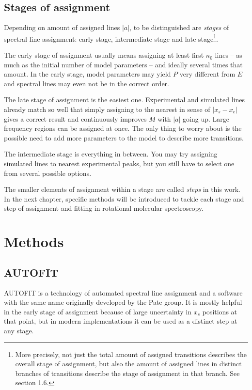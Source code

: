 \documentclass[11pt]{article}
\begin{document}
\subsection{Stages of assignment}

Depending on amount of assigned lines $|a|$, to be distinguished are \emph{stages} of spectral line assignment: early stage, intermediate stage and late stage\footnote{More precisely, not just the total amount of assigned transitions describes the overall stage of assignment, but also the amount of assigned lines in distinct branches of transitions describe the stage of assignment in that branch. See section 1.6.}.

The early stage of assignment usually means assigning at least first $n_0$ lines -- as much as the initial number of model parameters -- and ideally several times that amount. In the early stage, model parameters may yield $P$ very different from $E$ and spectral lines may even not be in the correct order. 

The late stage of assignment is the easiest one. Experimental and simulated lines already match so well that simply assigning to the nearest in sense of $|x_s - x_e|$ gives a correct result and continuously improves $M$ with $|a|$ going up. Large frequency regions can be assigned at once. The only thing to worry about is the possible need to add more parameters to the model to describe more transitions.  

The intermediate stage is everything in between. You may try assigning simulated lines to nearest experimental peaks, but you still have to select one from several possible options.

The smaller elements of  assignment within a stage are called \emph{steps} in this work. In the next chapter, specific methods will be introduced to tackle each stage and step of assignment and fitting in rotational molecular spectroscopy.

\section{Methods}


\subsection{AUTOFIT}

AUTOFIT is a technology of automated spectral line assignment and a software with the same name originally developed by the Pate group. It is mostly helpful in the early stage of assignment because of large uncertainty in $x_s$ positions at that point, but in modern implementations it can be used as a distinct step at any stage.
\end{document}
